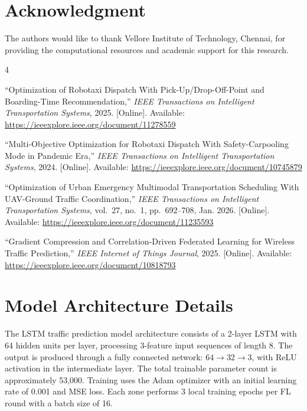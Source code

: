 \documentclass[journal]{IEEEtran}
\begin{document}

\FloatBarrier

\section*{Acknowledgment}
The authors would like to thank Vellore Institute of Technology, Chennai, for providing the computational resources and academic support for this research.


\begin{thebibliography}{4}

``Optimization of Robotaxi Dispatch With Pick-Up/Drop-Off-Point and Boarding-Time Recommendation,'' \textit{IEEE Transactions on Intelligent Transportation Systems}, 2025. [Online]. Available: \url{https://ieeexplore.ieee.org/document/11278559}

``Multi-Objective Optimization for Robotaxi Dispatch With Safety-Carpooling Mode in Pandemic Era,'' \textit{IEEE Transactions on Intelligent Transportation Systems}, 2024. [Online]. Available: \url{https://ieeexplore.ieee.org/document/10745879}

``Optimization of Urban Emergency Multimodal Transportation Scheduling With UAV-Ground Traffic Coordination,'' \textit{IEEE Transactions on Intelligent Transportation Systems}, vol.~27, no.~1, pp.~692--708, Jan. 2026. [Online]. Available: \url{https://ieeexplore.ieee.org/document/11235593}

``Gradient Compression and Correlation-Driven Federated Learning for Wireless Traffic Prediction,'' \textit{IEEE Internet of Things Journal}, 2025. [Online]. Available: \url{https://ieeexplore.ieee.org/document/10818793}

\end{thebibliography}


\appendix
\section{Model Architecture Details}
The LSTM traffic prediction model architecture consists of a 2-layer LSTM with 64 hidden units per layer, processing 3-feature input sequences of length 8. The output is produced through a fully connected network: $64 \rightarrow 32 \rightarrow 3$, with ReLU activation in the intermediate layer. The total trainable parameter count is approximately 53,000. Training uses the Adam optimizer with an initial learning rate of 0.001 and MSE loss. Each zone performs 3 local training epochs per FL round with a batch size of 16.
\end{document}
